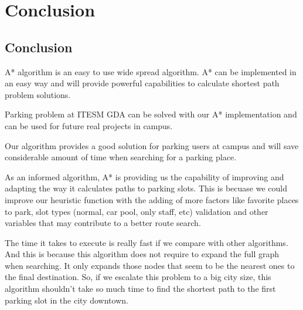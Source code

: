 \chapter{Conclusion}
\section{Conclusion}
A* algorithm is an easy to use wide spread algorithm. A* can be implemented in an easy way and will provide powerful capabilities to calculate shortest path problem solutions. 

Parking problem at ITESM GDA can be solved with our A* implementation and can be used for future real projects in campus. 

Our algorithm provides a good solution for parking users at campus and will save considerable amount of time when searching for a parking place. 

As an informed algorithm, A* is providing us the capability of improving and adapting the way it calculates paths to parking slots. This is becuase 
we could improve our heuristic function with the adding of more factors like favorite places to park, slot types (normal, car pool, only staff, etc) validation and 
other variables that may contribute to a better route search.

The time it takes to execute is really fast if we compare with other algorithms. And this is because this algorithm does not require to expand the full graph when searching.
It only expands those nodes that seem to be the nearest ones to the final destination. So, if we escalate this problem to a big city size, this algorithm shouldn't take so much 
time to find the shortest path to the first parking slot in the city downtown.
